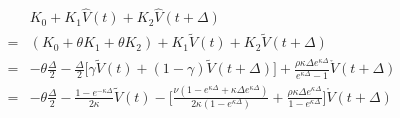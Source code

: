 \documentclass{ws-ijfe}
\begin{document}
\begin{equation}\label{QEK0K1K2}
\begin{split}
&K_0+K_1\hat{V}(t)+K_2\hat{V}(t+\Delta)\\
=&(K_0+\theta K_1+\theta K_2)+K_1\tilde{V}(t)+K_2\tilde{V}(t+\Delta)\\
=&-\theta\frac{\Delta}{2}-\frac{\Delta}{2}\big[\gamma\tilde{V}(t)+(1-\gamma)\tilde{V}(t+\Delta)\big]+\frac{\rho\kappa\Delta e^{\kappa\Delta}}{e^{\kappa\Delta}-1}\mathring{V}(t+\Delta)\\
=&-\theta\frac{\Delta}{2}-\frac{1-e^{-\kappa\Delta}}{2\kappa}\tilde{V}(t)-\bigg[\frac{\nu(1-e^{\kappa\Delta}+\kappa\Delta e^{\kappa\Delta})}{2\kappa(1-e^{\kappa\Delta})}+\frac{\rho\kappa\Delta e^{\kappa\Delta}}{1-e^{\kappa\Delta}}\bigg]\mathring{V}(t+\Delta)
\end{split}
\end{equation}
%
\end{document}
